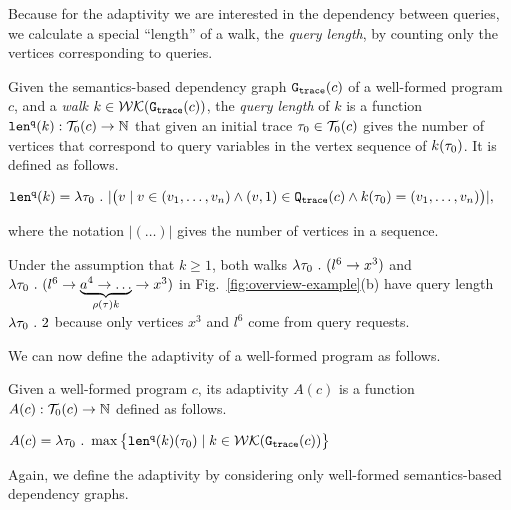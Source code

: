 Because for the adaptivity
we are interested in the dependency between queries,
we calculate a special ``length'' of a walk, the \emph{query length},  by counting only the vertices
corresponding to queries.
\begin{defn}
\label{def:qlen}
Given 
the semantics-based dependency graph $\mathtt{{G_{trace}}}({c})$ of a well-formed program $c$,
 and a \emph{walk} 
 $k \in \mathcal{WK}(\mathtt{{G_{trace}}}(c))$, 
the \emph{query length} of $k$ is a function $\mathtt{len}^{\tt q}(k):\mathcal{T}_0(c) \to \mathbb{N}$ that 
given an initial trace $\mathtt{\tau}_0\in \mathcal{T}_0(c)$ 
gives
the number of vertices that correspond to query variables in the vertex sequence of $k(\mathtt{\tau}_0)$.
It is defined as follows.
\begin{center}
   $
  \mathtt{len}^{\tt q}(k) = \lambda \mathtt{\tau}_0 ~.~ |\big( v \mid v \in (v_1, \ldots, v_{n}) \land (v, 1) \in \mathtt{{Q_{trace}}}(c) 
  \land k(\mathtt{\tau}_0) = (v_1, \ldots, v_{n}) \big)|,
$
\end{center}
where the notation $| (\ldots) |$ gives the number of vertices in a sequence.
\end{defn}

Under the assumption that $k \geq 1$, both walks $\lambda \mathtt{\tau}_0 ~.~ (l^6 \to x^3)$ and  $\lambda \mathtt{\tau}_0 ~.~ (l^6 \to \underbrace{a^4 \to \ldots}_{\rho(\mathtt{\tau}) k} \to x^3)$ in Fig.~\ref{fig:overview-example}(b) have query length $\lambda\mathtt{\tau}_0 ~.~ 2$ because only
vertices $x^3$ and $l^6$ come from query requests.

We can now define the adaptivity of a well-formed program as follows.
\begin{defn}
    \label{def:trace_adapt}
    Given a well-formed program ${c}$, 
    its adaptivity $A(c)$ is a function 
    $A(c) : \mathcal{T}_0(c)\to \mathbb{N}$
    defined as follows.
\begin{center}
$
    A(c) = \lambda \mathtt{\tau}_0 ~.~ \max \big 
    \{ \mathtt{len}^{\tt q}(k)(\mathtt{\tau}_0) \mid k \in \mathcal{WK}(\mathtt{{G_{trace}}}(c)) \big \} 
$
\end{center}
\end{defn}
Again, we define the adaptivity by considering only well-formed semantics-based dependency graphs.


